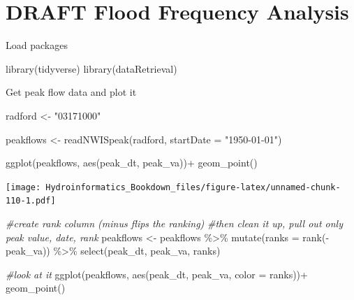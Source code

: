 \documentclass[
]{book}
\newenvironment{Shaded}{\begin{snugshade}}{\end{snugshade}}
\newcommand{\AttributeTok}[1]{\textcolor[rgb]{0.77,0.63,0.00}{#1}}
\newcommand{\CommentTok}[1]{\textcolor[rgb]{0.56,0.35,0.01}{\textit{#1}}}
\newcommand{\FunctionTok}[1]{\textcolor[rgb]{0.00,0.00,0.00}{#1}}
\newcommand{\NormalTok}[1]{#1}
\newcommand{\OtherTok}[1]{\textcolor[rgb]{0.56,0.35,0.01}{#1}}
\newcommand{\SpecialCharTok}[1]{\textcolor[rgb]{0.00,0.00,0.00}{#1}}
\newcommand{\StringTok}[1]{\textcolor[rgb]{0.31,0.60,0.02}{#1}}
\begin{document}
\hypertarget{floods}{%
\chapter{DRAFT Flood Frequency Analysis}\label{floods}}

Load packages

\begin{Shaded}
\begin{Highlighting}[]
\FunctionTok{library}\NormalTok{(tidyverse)}
\FunctionTok{library}\NormalTok{(dataRetrieval)}
\end{Highlighting}
\end{Shaded}

Get peak flow data and plot it

\begin{Shaded}
\begin{Highlighting}[]
\NormalTok{radford }\OtherTok{\textless{}{-}} \StringTok{"03171000"}

\NormalTok{peakflows }\OtherTok{\textless{}{-}} \FunctionTok{readNWISpeak}\NormalTok{(radford, }\AttributeTok{startDate =} \StringTok{"1950{-}01{-}01"}\NormalTok{)}

\FunctionTok{ggplot}\NormalTok{(peakflows, }\FunctionTok{aes}\NormalTok{(peak\_dt, peak\_va))}\SpecialCharTok{+}
  \FunctionTok{geom\_point}\NormalTok{()}
\end{Highlighting}
\end{Shaded}

\texttt{[image: Hydroinformatics\_Bookdown\_files/figure-latex/unnamed-chunk-110-1.pdf]}

\begin{Shaded}
\begin{Highlighting}[]
\CommentTok{\#create rank column (minus flips the ranking)}
\CommentTok{\#then clean it up, pull out only peak value, date, rank}
\NormalTok{peakflows }\OtherTok{\textless{}{-}}\NormalTok{ peakflows }\SpecialCharTok{\%\textgreater{}\%} \FunctionTok{mutate}\NormalTok{(}\AttributeTok{ranks =} \FunctionTok{rank}\NormalTok{(}\SpecialCharTok{{-}}\NormalTok{peak\_va)) }\SpecialCharTok{\%\textgreater{}\%}
              \FunctionTok{select}\NormalTok{(peak\_dt, peak\_va, ranks)}

\CommentTok{\#look at it}
\FunctionTok{ggplot}\NormalTok{(peakflows, }\FunctionTok{aes}\NormalTok{(peak\_dt, peak\_va, }\AttributeTok{color =}\NormalTok{ ranks))}\SpecialCharTok{+}
  \FunctionTok{geom\_point}\NormalTok{()}
\end{Highlighting}
\end{Shaded}
\end{document}
